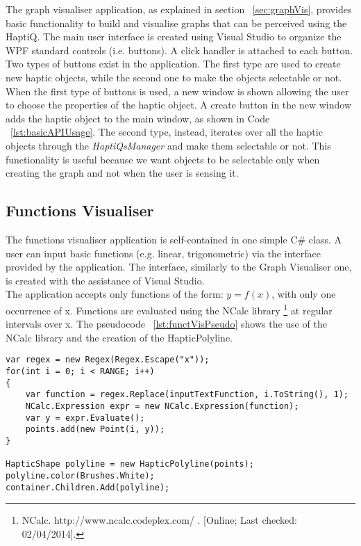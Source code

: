 The graph visualiser application, as explained in section ~\ref{sec:graphVis}, provides basic functionality to build and visualise graphs that can be perceived using the HaptiQ. 
The main user interface is created using Visual Studio to organize the WPF standard controls (i.e. buttons). A click handler is attached to each button. Two types of buttons exist in the application. The first type are used to create new haptic objects, while the second one to make the objects selectable or not. \\
When the first type of buttons is used, a new window is shown allowing the user to choose the properties of the haptic object. A create button in the new window adds the haptic object to the main window, as shown in Code ~\ref{lst:basicAPIUsage}.
The second type, instead, iterates over all the haptic objects through the \textit{HaptiQsManager} and make them selectable or not. This functionality is useful because we want objects to be selectable only when creating the graph and not when the user is sensing it.  


\subsection{Functions Visualiser}

The functions visualiser application is self-contained in one simple C\# class. A user can input basic functions (e.g. linear, trigonometric) via the interface provided by the application. The interface, similarly to the Graph Visualiser one, is created with the assistance of Visual Studio. \\
The application accepts only functions of the form: $ y = f(x) $, with only one occurrence of x. Functions are evaluated using the NCalc library \footnote{NCalc. http://www.ncalc.codeplex.com/ . [Online; Last checked: 02/04/2014].} at regular intervals over x. The pseudocode ~\ref{lst:functVisPseudo} shows the use of the NCalc library and the creation of the HapticPolyline. 

\lstset{style=sharpc1}
\begin{lstlisting}[caption={Function Visualiser pseudocode},label={lst:functVisPseudo}]
var regex = new Regex(Regex.Escape("x"));
for(int i = 0; i < RANGE; i++)
{
	var function = regex.Replace(inputTextFunction, i.ToString(), 1);
    NCalc.Expression expr = new NCalc.Expression(function);
    var y = expr.Evaluate();
    points.add(new Point(i, y));
}

HapticShape polyline = new HapticPolyline(points);
polyline.color(Brushes.White);
container.Children.Add(polyline);

\end{lstlisting}